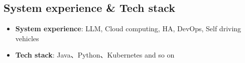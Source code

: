 \documentclass[letterpaper,11pt]{article}
\newcommand{\resumeSubHeadingListStart}{\begin{itemize}[leftmargin=*]}
\newcommand{\resumeSubHeadingListEnd}{\end{itemize}}
\begin{document}
\begin{spacing}{0.80}
	
	\section{System experience \& Tech stack}
	\resumeSubHeadingListStart
	\item{
		\textbf{System experience}{: LLM, Cloud computing, HA, DevOps, Self driving vehicles}
		\hfill
	}
	\item{
		\textbf{Tech stack}{: Java、Python、Kubernetes and so on}
		\hfill
	}
	\resumeSubHeadingListEnd
	
	\end{spacing}
	
	
	
	\newpage
	
\end{document}
